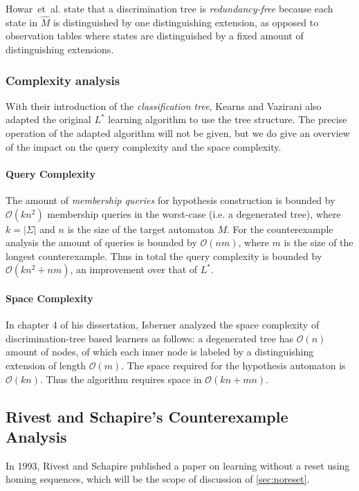 \documentclass[multi,crop=false,class=article]{standalone}
\begin{document}
Howar~et~al. state that a discrimination tree is \textit{redundancy-free} because
each state in $\hat M$ is distinguished by one distinguishing extension, as
opposed to observation tables where states are distinguished by a fixed amount
of distinguishing extensions\cite{Howar2014}.

\subsubsection{Complexity analysis}
\label{sec:complexity-analysis}
With their introduction of the \textit{classification tree}, Kearns and Vazirani
also adapted the original $L^*$ learning algorithm to use the tree
structure\cite{Kearns1994}. The precise operation of the adapted algorithm will not
be given, but we do give an overview of the impact on the query complexity and
the space complexity.

\paragraph{Query Complexity} The amount of \textit{membership queries} for
hypothesis construction is bounded by $\mathcal{O}(kn^2)$ membership queries in
the worst-case (i.e. a degenerated tree)\cite{Howar2014,Kearns1994,Isberner2014b},
where $k = |\Sigma |$ and $n$ is the size of the target automaton $M$. For the
counterexample analysis the amount of queries is bounded by $\mathcal{O}(nm)$,
where $m$ is the size of the longest counterexample\cite{Kearns1994}. Thus in
total the query complexity is bounded by $\mathcal{O}(kn^2 + nm)$, an
improvement over that of $L^*$.

\paragraph{Space Complexity} In chapter 4 of his dissertation, Isberner analyzed
the space complexity of discrimination-tree based learners as follows: a
degenerated tree has $\mathcal{O}(n)$ amount of nodes, of which each inner node
is labeled by a distinguishing extension of length
$\mathcal{O}(m)$\cite{Isberner2015a}.  The space required for the hypothesis
automaton is $\mathcal{O}(kn)$\cite{Isberner2015a}. Thus the algorithm requires
space in $\mathcal{O}(kn + mn)$\cite{Isberner2014b,Isberner2015a}.

\subsection{Rivest and Schapire's Counterexample Analysis}
\label{sec:rivest-schap-count}
In 1993, Rivest and Schapire published a paper on learning without a reset using
homing sequences\cite{Rivest1993}, which will be the scope of discussion of
\cref{sec:noreset}.
\end{document}
